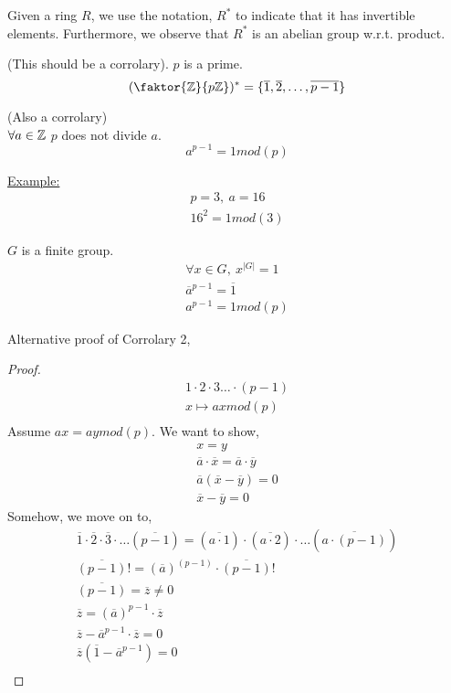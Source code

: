 \documentclass[../notes.tex]{subfiles}
\begin{document}
\begin{definition}
    Given a ring $R$, we use the notation, $R^*$ to
    indicate that it has invertible elements. Furthermore, we observe that
    $R^*$ is an abelian group w.r.t. product.
\end{definition}
\begin{theorem}
    (This should be a corrolary). $p$ is a prime.
    \[
        (\faktor{\Z}{p\Z})^*=\{\overline{1},\overline{2},\dots,\overline{p-1}\}
    \]
\end{theorem}
\begin{theorem}
    (Also a corrolary)\\
    $\forall a\in \mathbb{Z}$ $p$ does not divide $a$.
    \[
        a^{p-1}=1mod(p)
    \]
\end{theorem}
\underline{Example:}
\begin{align*}
    p=3,\ a=16\\
    16^2=1mod(3)
\end{align*}
\begin{proposition}
    $G$ is a finite group.
    \begin{align*}
        \forall x\in G,\ x^{|G|}=1\\
        \overline{a}^{p-1}=\overline{1}\\
        a^{p-1}=1mod(p)
    \end{align*}
\end{proposition}
Alternative proof of Corrolary 2,
\begin{proof}
    \begin{align*}
        1\cdot 2\cdot 3\dots\cdot(p-1)\\
        x\mapsto axmod(p)\\
    \end{align*}
    Assume $ax=aymod(p)$. We want to show,
    \begin{align*}
        x=y\\
        \overline{a}\cdot\overline{x}= \overline{a}\cdot\overline{y}\\
        \overline{a}(\overline{x}-\overline{y})=0\\
        \overline{x}-\overline{y}=0
    \end{align*}
    Somehow, we move on to,
    \begin{align*}
        \overline{1} \cdot \overline{2} \cdot \overline{3}
        \cdot\dots
        (\overline{p-1})=
        (\overline{a\cdot 1})
        \cdot
        (\overline{a\cdot 2})
        \cdot\dots
        (\overline{a\cdot (p-1)})\\
        \overline{(p-1)}!=(\overline{a})^(p-1)\cdot\overline{(p-1)}!\\
        \overline{(p-1)}=\overline{z}\neq{0}\\
        \overline{z}=(\overline{a})^{p-1}\cdot\overline{z}\\
        \overline{z}-\overline{a}^{p-1}\cdot\overline{z}=0\\
        \overline{z}(\overline{1}-\overline{a}^{p-1})=0\\
    \end{align*}
\end{proof}
\end{document}
